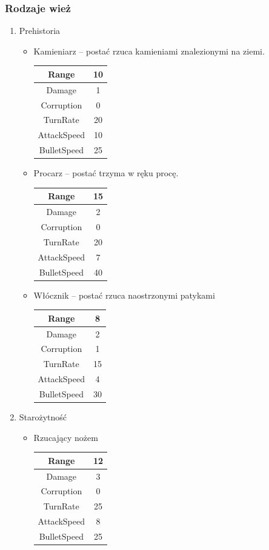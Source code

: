 \documentclass[a4paper,12pt, twoside, titlepage]{article}
\begin{document}
\subsubsection{Rodzaje wież}
\begin{enumerate}
	\item Prehistoria
	\begin{itemize}
		\item Kamieniarz -- postać rzuca kamieniami znalezionymi na ziemi.
		\begin{longtable}[l]{|c|c|} 
		\hline
		Range & 10 \\
		\hline
		Damage & 1 \\ 
		\hline 
		Corruption & 0 \\ 
		\hline
		TurnRate & 20 \\ 
		\hline
		AttackSpeed & 10 \\ 
		\hline
		BulletSpeed & 25 \\ 
		\hline
		\end{longtable}

		\item Procarz -- postać trzyma w ręku procę.
		\begin{longtable}[l]{|c|c|} 
		\hline
		Range & 15 \\
		\hline
		Damage & 2 \\ 
		\hline 
		Corruption & 0 \\ 
		\hline
		TurnRate & 20 \\ 
		\hline
		AttackSpeed & 7 \\ 
		\hline
		BulletSpeed & 40 \\ 
		\hline
		\end{longtable}		
		
		\item Włócznik -- postać rzuca naostrzonymi patykami
		\begin{longtable}[l]{|c|c|} 
		\hline
		Range & 8 \\
		\hline
		Damage & 2 \\ 
		\hline 
		Corruption & 1 \\ 
		\hline
		TurnRate & 15 \\ 
		\hline
		AttackSpeed & 4 \\ 
		\hline
		BulletSpeed & 30 \\ 
		\hline
		\end{longtable}	
	\end{itemize}
	
	\item Starożytność
	\begin{itemize}
		\item Rzucający nożem
		\begin{longtable}[l]{|c|c|} 
		\hline
		Range & 12 \\
		\hline
		Damage & 3 \\ 
		\hline 
		Corruption & 0 \\ 
		\hline
		TurnRate & 25 \\ 
		\hline
		AttackSpeed & 8 \\ 
		\hline
		BulletSpeed & 25 \\ 
		\hline
		\end{longtable}	
		

\end{itemize}
\end{enumerate}
\end{document}

